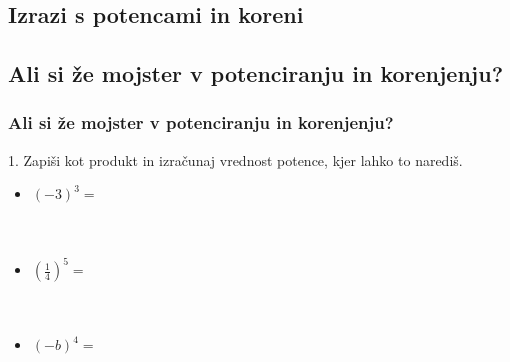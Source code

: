 
    \subsection{Izrazi s potencami in koreni}




    \subsection{Ali si že mojster v potenciranju in korenjenju?}

        \begin{frame}[t]
            \frametitle{Ali si že mojster v potenciranju in korenjenju?}

            \begin{alertblock}{1. Zapiši kot produkt in izračunaj vrednost potence, kjer lahko to narediš.}
                \begin{itemize}
                    \item $(-3)^3=$ \\ ~ \\ ~ \\
                    \item $\left(\frac{1}{4}\right)^5=$ \\ ~ \\ ~ \\
                    \item $(-b)^4=$ \\ ~ \\ ~ \\
                \end{itemize}
            \end{alertblock}
        \end{frame}

